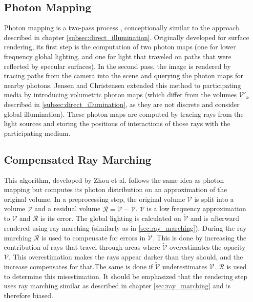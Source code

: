 \subsection{Photon Mapping}
Photon mapping is a two-pass process \cite{10.1145/280814.280925}, conceptionally similar to the approach described in chapter \ref{subsec:direct_illumination}. Originally developed for surface rendering\cite{10.5555/275458.275461}, its first step is the computation of two photon maps\cite{10.1145/280814.280925} (one for lower frequency global lighting, and one for light that traveled on paths that were reflected by specular surfaces). In the second pass, the image is rendered by tracing paths from the camera into the scene and querying the photon maps for nearby photons.
Jensen and Christensen \cite{10.1145/280814.280925} extended this method to participating media by introducing volumetric photon maps (which differ from the volumes $\mathcal{V}'_k$ described in \ref{subsec:direct_illumination}, as they are not discrete and consider global illumination). These photon maps are computed by tracing rays from the light sources and storing the positions of interactions of those rays with the participating medium.
\subsection{Compensated Ray Marching}
This algorithm, developed by Zhou et al. \cite{zhou2007real-time} follows the same idea as photon mapping but computes its photon distribution on an approximation of the original volume.
In a preprocessing step, the original volume $\mathcal{V}$ is split into a volume $\widetilde{\mathcal{V}}$ and a residual volume $\mathcal{R} = \mathcal{V} - \widetilde{\mathcal{V}}$. $\widetilde{\mathcal{V}}$ is a low frequency approximation to $\mathcal{V}$ and $\mathcal{R}$ is its error. The global lighting is calculated on $\widetilde{\mathcal{V}}$ and is afterward rendered using ray marching (similarly as in \ref{sec:ray_marching}). During the ray marching $\mathcal{R}$ is used to compensate for errors in $\widetilde{\mathcal{V}}$. This is done by increasing the contribution of rays that travel through areas where $\widetilde{\mathcal{V}}$ overestimates the opacity $\mathcal{V}$. This overestimation makes the rays appear darker than they should, and the increase compensates for that.The same is done if $\widetilde{\mathcal{V}}$ underestimates $\mathcal{V}$. $\mathcal{R}$ is used to determine this misestimation. 
It should be emphasized that the rendering step uses ray marching similar as described in chapter \ref{sec:ray_marching} and is therefore biased. 
